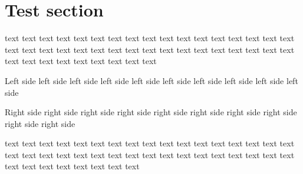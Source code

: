 \documentclass{book}
\begin{document}
\section*{Test section}
text text text text text text text text text text text text text text text text text text text text text text text text text text text text text text text text text text text text text text text text text text text

\vspace{1em}

\begin{pairs}

\begin{Leftside}
\beginnumbering
\pstart
Left side left side left side left side left side left side left side left side left side left side 
\pend
\endnumbering
\end{Leftside}

\begin{Rightside}
\beginnumbering
\pstart
Right side right side right side right side right side right side right side right side right side right side 
\pend
\endnumbering
\end{Rightside}

\Columns
\end{pairs}

\vspace{1em}

text text text text text text text text text text text text text text text text text text text text text text text text text text text text text text text text text text text text text text text text text text
\end{document}
